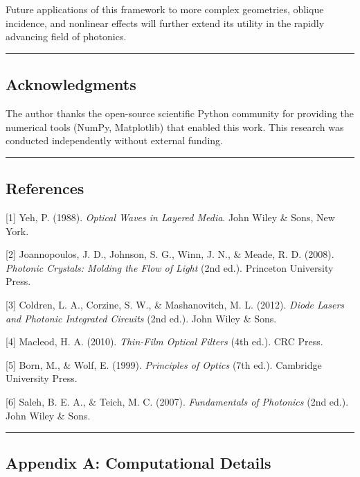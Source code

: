 \documentclass[
]{article}
\begin{document}
Future applications of this framework to more complex geometries,
oblique incidence, and nonlinear effects will further extend its utility
in the rapidly advancing field of photonics.

\begin{center}\rule{0.5\linewidth}{0.5pt}\end{center}

\subsection{Acknowledgments}\label{acknowledgments}

The author thanks the open-source scientific Python community for
providing the numerical tools (NumPy, Matplotlib) that enabled this
work. This research was conducted independently without external
funding.

\begin{center}\rule{0.5\linewidth}{0.5pt}\end{center}

\subsection{References}\label{references}

{[}1{]} Yeh, P. (1988). \emph{Optical Waves in Layered Media}. John
Wiley \& Sons, New York.

{[}2{]} Joannopoulos, J. D., Johnson, S. G., Winn, J. N., \& Meade, R.
D. (2008). \emph{Photonic Crystals: Molding the Flow of Light} (2nd
ed.). Princeton University Press.

{[}3{]} Coldren, L. A., Corzine, S. W., \& Mashanovitch, M. L. (2012).
\emph{Diode Lasers and Photonic Integrated Circuits} (2nd ed.). John
Wiley \& Sons.

{[}4{]} Macleod, H. A. (2010). \emph{Thin-Film Optical Filters} (4th
ed.). CRC Press.

{[}5{]} Born, M., \& Wolf, E. (1999). \emph{Principles of Optics} (7th
ed.). Cambridge University Press.

{[}6{]} Saleh, B. E. A., \& Teich, M. C. (2007). \emph{Fundamentals of
Photonics} (2nd ed.). John Wiley \& Sons.

\begin{center}\rule{0.5\linewidth}{0.5pt}\end{center}

\subsection{Appendix A: Computational
Details}\label{appendix-a-computational-details}
\end{document}
